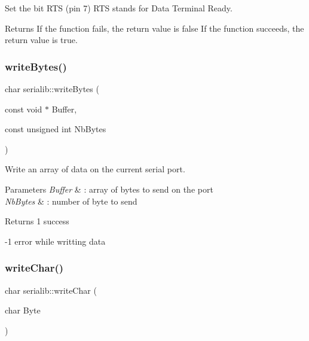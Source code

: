 Set the bit R\+TS (pin 7) R\+TS stands for Data Terminal Ready. 

\begin{DoxyReturn}{Returns}
If the function fails, the return value is false If the function succeeds, the return value is true. 
\end{DoxyReturn}
\mbox{\label{classserialib_aa14196b6f422584bf5eebc4ddb71d483}} 
\subsubsection{\texorpdfstring{write\+Bytes()}{writeBytes()}}
{\footnotesize\ttfamily char serialib\+::write\+Bytes (\begin{DoxyParamCaption}\item[{const void $\ast$}]{Buffer,  }\item[{const unsigned int}]{Nb\+Bytes }\end{DoxyParamCaption})}



Write an array of data on the current serial port. 


\begin{DoxyParams}{Parameters}
{\em Buffer} & \+: array of bytes to send on the port \\
\hline
{\em Nb\+Bytes} & \+: number of byte to send \\
\hline
\end{DoxyParams}
\begin{DoxyReturn}{Returns}
1 success 

-\/1 error while writting data 
\end{DoxyReturn}
\mbox{\label{classserialib_aa6d231cb99664a613bcb503830f73497}} 
\subsubsection{\texorpdfstring{write\+Char()}{writeChar()}}
{\footnotesize\ttfamily char serialib\+::write\+Char (\begin{DoxyParamCaption}\item[{char}]{Byte }\end{DoxyParamCaption})}



